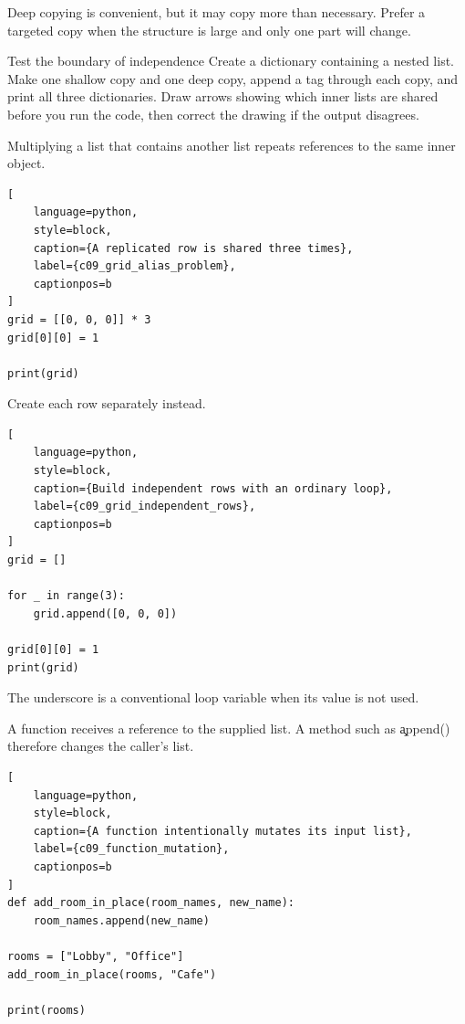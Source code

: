 Deep copying is convenient, but it may copy more than necessary. Prefer a
targeted copy when the structure is large and only one part will change.

\begin{TryBox}{Test the boundary of independence}
Create a dictionary containing a nested list. Make one shallow copy and one
deep copy, append a tag through each copy, and print all three dictionaries.
Draw arrows showing which inner lists are shared before you run the code, then
correct the drawing if the output disagrees.
\end{TryBox}


Multiplying a list that contains another list repeats references to the same
inner object.

\begin{lstlisting}[
    language=python,
    style=block,
    caption={A replicated row is shared three times},
    label={c09_grid_alias_problem},
    captionpos=b
]
grid = [[0, 0, 0]] * 3
grid[0][0] = 1

print(grid)
\end{lstlisting}

Create each row separately instead.

\begin{lstlisting}[
    language=python,
    style=block,
    caption={Build independent rows with an ordinary loop},
    label={c09_grid_independent_rows},
    captionpos=b
]
grid = []

for _ in range(3):
    grid.append([0, 0, 0])

grid[0][0] = 1
print(grid)
\end{lstlisting}

The underscore is a conventional loop variable when its value is not used.


A function receives a reference to the supplied list. A method such as
\c{append()} therefore changes the caller's list.

\begin{lstlisting}[
    language=python,
    style=block,
    caption={A function intentionally mutates its input list},
    label={c09_function_mutation},
    captionpos=b
]
def add_room_in_place(room_names, new_name):
    room_names.append(new_name)

rooms = ["Lobby", "Office"]
add_room_in_place(rooms, "Cafe")

print(rooms)
\end{lstlisting}

